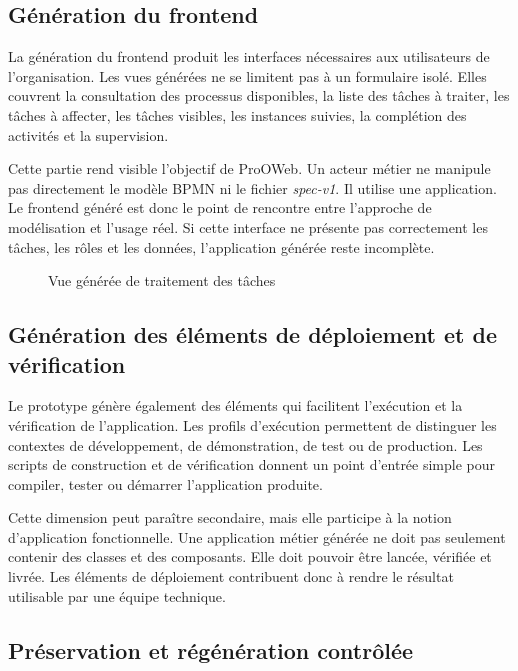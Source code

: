 \subsection{Génération du frontend}

La génération du frontend produit les interfaces nécessaires aux utilisateurs de l'organisation. Les vues générées ne se limitent pas à un formulaire isolé. Elles couvrent la consultation des processus disponibles, la liste des tâches à traiter, les tâches à affecter, les tâches visibles, les instances suivies, la complétion des activités et la supervision.

Cette partie rend visible l'objectif de ProOWeb. Un acteur métier ne manipule pas directement le modèle BPMN ni le fichier \textit{spec-v1}. Il utilise une application. Le frontend généré est donc le point de rencontre entre l'approche de modélisation et l'usage réel. Si cette interface ne présente pas correctement les tâches, les rôles et les données, l'application générée reste incomplète.

\begin{figure}[H]
\centering
{}
\caption{Vue générée de traitement des tâches}
\label{fig:chap4-vue-taches-generee}
\end{figure}

\subsection{Génération des éléments de déploiement et de vérification}

Le prototype génère également des éléments qui facilitent l'exécution et la vérification de l'application. Les profils d'exécution permettent de distinguer les contextes de développement, de démonstration, de test ou de production. Les scripts de construction et de vérification donnent un point d'entrée simple pour compiler, tester ou démarrer l'application produite.

Cette dimension peut paraître secondaire, mais elle participe à la notion d'application fonctionnelle. Une application métier générée ne doit pas seulement contenir des classes et des composants. Elle doit pouvoir être lancée, vérifiée et livrée. Les éléments de déploiement contribuent donc à rendre le résultat utilisable par une équipe technique.

\subsection{Préservation et régénération contrôlée}

